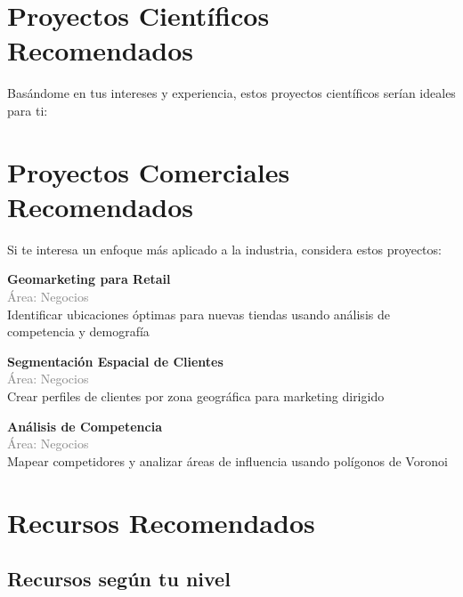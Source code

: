 \documentclass[11pt,a4paper]{article}
\begin{document}
\section*{ Proyectos Científicos Recomendados}

Basándome en tus intereses y experiencia, estos proyectos científicos serían ideales para ti:


\section*{ Proyectos Comerciales Recomendados}

Si te interesa un enfoque más aplicado a la industria, considera estos proyectos:


\begin{tcolorbox}[colback=orange!5,colframe=darkorange,title={\small Proyecto Comercial \#1}]
\textbf{Geomarketing para Retail}\\[0.2cm]
\textcolor{gray}{\small Área: Negocios}\\[0.2cm]
Identificar ubicaciones óptimas para nuevas tiendas usando análisis de competencia y demografía
\end{tcolorbox}


\begin{tcolorbox}[colback=orange!5,colframe=darkorange,title={\small Proyecto Comercial \#2}]
\textbf{Segmentación Espacial de Clientes}\\[0.2cm]
\textcolor{gray}{\small Área: Negocios}\\[0.2cm]
Crear perfiles de clientes por zona geográfica para marketing dirigido
\end{tcolorbox}


\begin{tcolorbox}[colback=orange!5,colframe=darkorange,title={\small Proyecto Comercial \#3}]
\textbf{Análisis de Competencia}\\[0.2cm]
\textcolor{gray}{\small Área: Negocios}\\[0.2cm]
Mapear competidores y analizar áreas de influencia usando polígonos de Voronoi
\end{tcolorbox}


\section*{ Recursos Recomendados}

\subsection*{Recursos según tu nivel}
\end{document}

